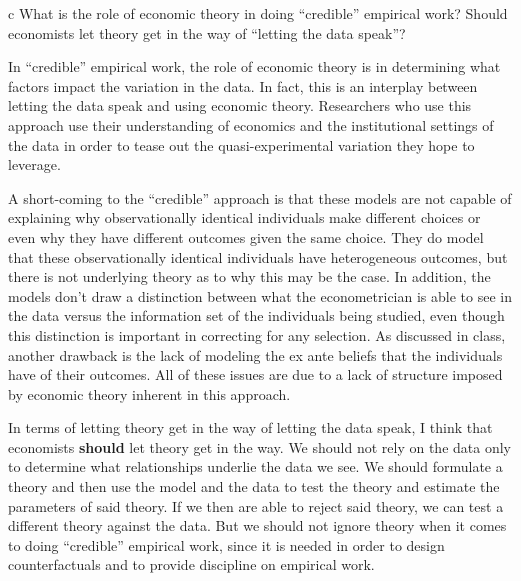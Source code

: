 \documentclass{article}
\begin{document}
\begin{problem}{c}
What is the role of economic theory in doing “credible” empirical work? Should economists let theory get in the way of “letting the data speak”?
\end{problem}

In ``credible'' empirical work, the role of economic theory is in determining what factors impact the variation in the data. In fact, this is an interplay between letting the data speak and using economic theory. Researchers who use this approach use their understanding of economics and the institutional settings of the data in order to tease out the quasi-experimental variation they hope to leverage.

A short-coming to the ``credible'' approach is that these models are not capable of explaining why observationally identical individuals make different choices or even why they have different outcomes given the same choice. They do model that these observationally identical individuals have heterogeneous outcomes, but there is not underlying theory as to why this may be the case. In addition, the models don't draw a distinction between what the econometrician is able to see in the data versus the information set of the individuals being studied, even though this distinction is important in correcting for any selection. As discussed in class, another drawback is the lack of modeling the ex ante beliefs that the individuals have of their outcomes. All of these issues are due to a lack of structure imposed by economic theory inherent in this approach. 

In terms of letting theory get in the way of letting the data speak, I think that economists \textbf{should} let theory get in the way. We should not rely on the data only to determine what relationships underlie the data we see. We should formulate a theory and then use the model and the data to test the theory and estimate the parameters of said theory. If we then are able to reject said theory, we can test a different theory against the data. But we should not ignore theory when it comes to doing ``credible'' empirical work, since it is needed in order to design counterfactuals and to provide discipline on empirical work.

\newpage

\end{document}
